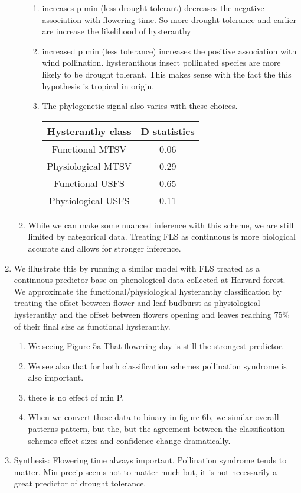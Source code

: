 \documentclass{article}
\begin{document}
\begin{enumerate}
\begin{enumerate}
\begin{enumerate}
        \item  increases p min (less drought tolerant) decreases the negative association with flowering time. So more drought tolerance and earlier are increase the likelihood of hysteranthy
        \item increased p min (less tolerance) increases the positive association with wind pollination. hysteranthous insect pollinated species are more likely to be drought tolerant. This makes sense with the fact the this hypothesis is tropical in origin.
        \item The phylogenetic signal also varies with these choices.\\ 
        \begin{tabular}{|c|c|}
           \hline
            Hysteranthy class & D statistics \\
            \hline
             Functional MTSV & 0.06\\
             Physiological MTSV & 0.29\\
             Functional USFS & 0.65\\
             Physiological USFS & 0.11\\ %
             \hline
        \end{tabular}
    \end{enumerate}
   \item While we can make some nuanced inference with this scheme, we are still limited by categorical data. Treating FLS as continuous is more biological accurate and allows for stronger inference. 
    \end{enumerate}
    \item We illustrate this by running a similar model with FLS treated as a continuous predictor base on phenological data collected at Harvard forest. We approximate the functional/physiological hysteranthy classification by treating the offset between flower and leaf budburst as physiological hysteranthy and the offset between flowers opening and leaves reaching 75\% of their final size as functional hysteranthy.
    \begin{enumerate}
        \item We seeing Figure 5a That flowering day is still the strongest predictor. 
        \item We see also that for both classification schemes pollination syndrome is also important.
        \item there is no effect of min P.
        \item When we convert these data to binary in figure 6b, we similar overall patterns pattern, but the, but the agreement between the classification schemes effect sizes and confidence change dramatically. %
    \end{enumerate}
    \item Synthesis: Flowering time always important. Pollination syndrome tends to matter. Min precip seems not to matter much but, it is not necessarily a great predictor of drought tolerance. 
    

\end{enumerate}
\end{document}
